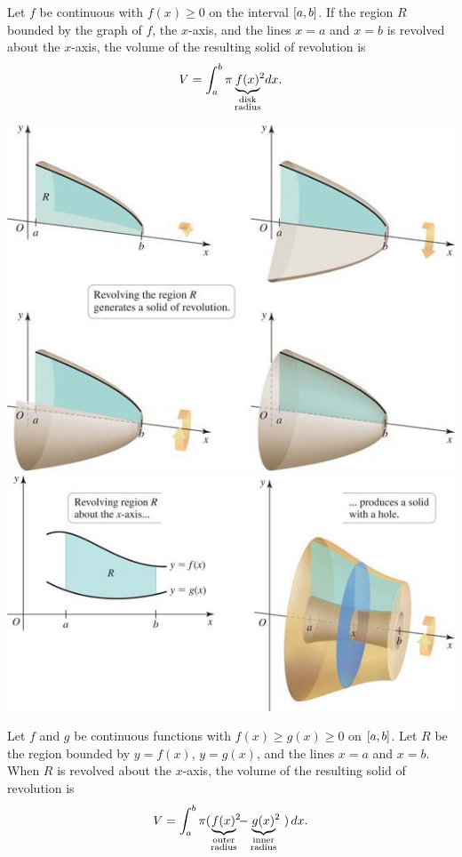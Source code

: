 \documentclass[../mathNotesPreamble]{subfiles}
\begin{document}
  \begin{thmBox*}
    Let $f$ be continuous with $f(x)\geq 0$ on the interval ${\left[a,b\right]}$. If the region $R$ bounded by the graph of $f$, the $x$-axis, and the lines $x=a$ and $x=b$ is revolved about the $x$-axis, the volume of the resulting solid of revolution is
      \[V=\int_a^b \pi\underbrace{f(x)^{\mathrlap{2}}}_{\substack{\textnormal{disk}\\\textnormal{radius}}}\,dx.\]
  \end{thmBox*}
  \begin{center}
    \includegraphics[width=0.4\linewidth]{../images/briggs_06_03/fig06_28}
    \hspace*{0.075\linewidth}
    \includegraphics[width=0.45\linewidth]{../images/briggs_06_03/fig06_31}
  \end{center}

  \begin{thmBox*}
    Let $f$ and $g$ be continuous functions with $f(x)\geq g(x)\geq 0$ on ${\left[a,b\right]}$. Let $R$ be the region bounded by $y=f(x)$, $y=g(x)$, and the lines $x=a$ and $x=b$. When $R$ is revolved about the $x$-axis, the volume of the resulting solid of revolution is
      \[V=\int_a^b \pi (\underbrace{f(x)^{\mathrlap{2}}}_{\substack{\textnormal{outer}\\\textnormal{radius}}}-\underbrace{g(x)^{\mathrlap{2}}}_{\substack{\textnormal{inner}\\\textnormal{radius}}}\phantom{^2})\,dx.\]
  \end{thmBox*}
  \pagebreak
\end{document}
